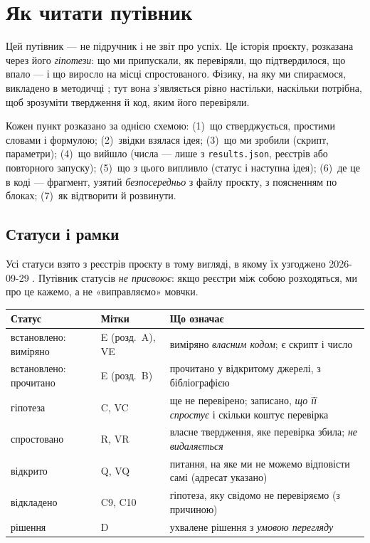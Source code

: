 \chapter{Як читати путівник}\label{ch:g00}

Цей путівник --- не підручник і не звіт про успіх. Це історія проєкту, розказана через
його \emph{гіпотези}: що ми припускали, як перевіряли, що підтвердилося, що впало --- і що
виросло на місці спростованого. Фізику, на яку ми спираємося, викладено в методичці
\cite{Manual}; тут вона з'являється рівно настільки, наскільки потрібна, щоб зрозуміти
твердження й код, яким його перевіряли.

Кожен пункт розказано за однією схемою: (1)~що стверджується, простими словами і
формулою; (2)~звідки взялася ідея; (3)~що ми зробили (скрипт, параметри); (4)~що вийшло
(числа --- лише з \texttt{results.json}, реєстрів або повторного запуску); (5)~що з цього
випливло (статус і наступна ідея); (6)~де це в коді --- фрагмент, узятий \emph{безпосередньо}
з файлу проєкту, з поясненням по блоках; (7)~як відтворити й розвинути.

\section{Статуси і рамки}\label{sec:g00-status}

Усі статуси взято з реєстрів проєкту в тому вигляді, в якому їх узгоджено 2026-09-29
\cite{RegEst,RegConj,RegDec,RegQ,RegLog,RegViz}. Путівник статусів \emph{не присвоює}: якщо
реєстри між собою розходяться, ми про це кажемо, а не «виправляємо» мовчки.

\begin{center}\small
\begin{tabularx}{\textwidth}{@{}p{3.3cm}p{2.3cm}X@{}}
\toprule
Статус & Мітки & Що означає \\
\midrule
встановлено: виміряно & E (розд.~A), VE & виміряно \emph{власним кодом}; є скрипт і число \\
встановлено: прочитано & E (розд.~B) & прочитано у відкритому джерелі, з бібліографією \\
гіпотеза & C, VC & ще не перевірено; записано, \emph{що її спростує} і скільки коштує перевірка \\
спростовано & R, VR & власне твердження, яке перевірка збила; \emph{не видаляється} \\
відкрито & Q, VQ & питання, на яке ми не можемо відповісти самі (адресат указано) \\
відкладено & C9, C10 & гіпотеза, яку свідомо не перевіряємо (з причиною) \\
рішення & D & ухвалене рішення з \emph{умовою перегляду} \\
\bottomrule
\end{tabularx}
\end{center}

